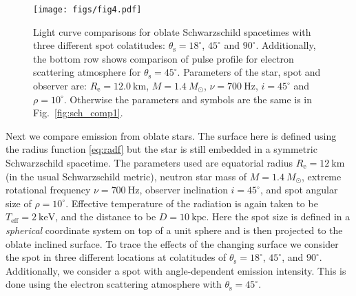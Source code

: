 \documentclass{aa}
\newcommand{\sch}{Schwarzschild }
\newcommand{\Msun}{\ensuremath{M_{\odot}}}
\begin{document}
\begin{figure}
\centering
\texttt{[image: figs/fig4.pdf]}
\caption{\label{fig:osch_comp700}
  Light curve comparisons for oblate \sch spacetimes with three different spot colatitudes: $\theta_{\mathrm{s}} = 18^{\circ}$, $45^{\circ}$ and $90^{\circ}$.
  Additionally, the bottom row shows comparison of pulse profile for electron scattering atmosphere for $\theta_{\mathrm{s}} = 45^{\circ}$.
  Parameters of the star, spot and observer are: $R_{\mathrm{e}} = 12.0~\mathrm{km}$, $M = 1.4~\Msun$, $\nu = 700~\mathrm{Hz}$, $i = 45^{\circ}$ and $\rho = 10^{\circ}$.
  Otherwise the parameters and symbols are the same is in Fig.~\ref{fig:sch_comp1}.
  }
\end{figure}

Next we compare emission from oblate stars.
The surface here is defined using the radius function \eqref{eq:radf} but the star is still embedded in a symmetric \sch spacetime.
The parameters used are equatorial radius $R_{\mathrm{e}} = 12~\mathrm{km}$ (in the usual \sch metric), neutron star mass of $M = 1.4~\Msun$, extreme rotational frequency $\nu = 700~\mathrm{Hz}$, observer inclination $i=45^{\circ}$, and spot angular size of $\rho = 10^{\circ}$.
Effective temperature of the radiation is again taken to be $T_{\mathrm{eff}} = 2~\mathrm{keV}$, and the distance to be $D = 10~\mathrm{kpc}$.
Here the spot size is defined in a \textit{spherical} coordinate system on top of a unit sphere and is then projected to the oblate inclined surface.
To trace the effects of the changing surface we consider the spot in three different locations at colatitudes of $\theta_{\mathrm{s}} = 18^{\circ}$, $45^{\circ}$, and $90^{\circ}$.
Additionally, we consider a spot with angle-dependent emission intensity.
This is done using the electron scattering atmosphere with $\theta_{\mathrm{s}} = 45^{\circ}$.
\end{document}
